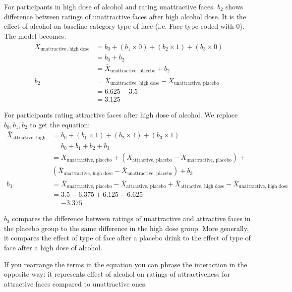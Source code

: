 For participants in high dose of alcohol and rating unattractive faces. $b_2$ shows difference between ratings of unattractive faces after high alcohol dose. It is the effect of alcohol on baseline category type of face (i.e. Face type coded with 0). The model becomes:
\begin{equation}
\begin{split}
\bar{X}_{\text{unattractive, high dose}} & = b_0 + (b_1 \times 0) + (b_2 \times 1) + (b_3 \times 0) \\
& = b_0 + b_2 \\
& = \bar{X}_{\text{unattractive, placebo}} + b_2 \\
b_2 & = \bar{X}_{\text{unattractive, high dose}} - \bar{X}_{\text{unattractive, placebo}} \\
& = 6.625 - 3.5\\
& = 3.125
\end{split}
\end{equation}


For participants rating attractive faces after high dose of alcohol. We replace $b_0, b_1, b_2$ to get the equation:
\begin{equation}
\begin{split}
\bar{X}_{\text{attractive, high dose}} & = b_0 + (b_1 \times 1) + (b_2 \times 1) + (b_3 \times 1) \\
& = b_0 + b_1 + b_2 + b_3 \\
& = \bar{X}_{\text{unattractive, placebo}} + (\bar{X}_{\text{attractive, placebo}} - \bar{X}_{\text{unattractive, placebo}}) +  \\
 & (\bar{X}_{\text{unattractive, high dose}} - \bar{X}_{\text{unattractive, placebo}}) + b_3\\
b_3 & = \bar{X}_{\text{unattractive, placebo}} - \bar{X}_{\text{attractive, placebo}}  + \bar{X}_{\text{attractive, high dose}} - \bar{X}_{\text{unattractive, high dose}} \\
& = 3.5 - 6.375 + 6.125 - 6.625\\
& = -3.375
\end{split}
\end{equation}

$b_3$ compares the difference between ratings of unattractive and attractive faces in the placebo group to the same difference in the high dose group. More generally, it compares the effect of type of face after a placebo drink to the effect of type of face after a high dose of alcohol. 

If you rearrange the terms in the equation you can phrase the interaction in the opposite way: it represents effect of alcohol on ratings of attractiveness for attractive faces compared to unattractive ones.

